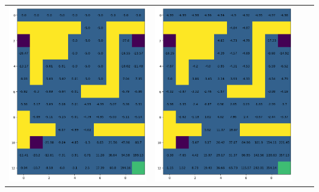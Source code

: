 \documentclass[12pt,a4paper]{report}
\begin{document}
\begin{landscape}
\begin{center}
\begin{tabular}{c || c  c  c}
            \includegraphics[width=0.35\textheight]{assets/dp/analysis/prob_0.25_gamma_0.8_value.png}
        &
            \includegraphics[width=0.35\textheight]{assets/dp/analysis/prob_0.5_gamma_0.8_value.png}

\end{tabular}
\end{center}
\end{landscape}
\end{document}
